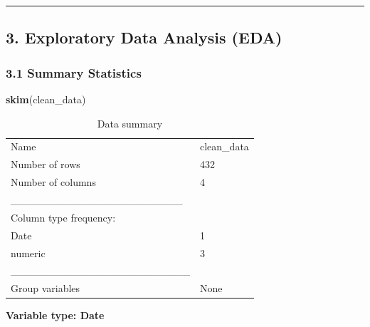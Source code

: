 \documentclass[
]{article}
\newenvironment{Shaded}{\begin{snugshade}}{\end{snugshade}}
\newcommand{\FunctionTok}[1]{\textcolor[rgb]{0.13,0.29,0.53}{\textbf{#1}}}
\newcommand{\NormalTok}[1]{#1}
\begin{document}
\begin{center}\rule{0.5\linewidth}{0.5pt}\end{center}

\subsection{3. Exploratory Data Analysis
(EDA)}\label{exploratory-data-analysis-eda}

\subsubsection{3.1 Summary Statistics}\label{summary-statistics}

\begin{Shaded}
\begin{Highlighting}[]
\FunctionTok{skim}\NormalTok{(clean\_data)}
\end{Highlighting}
\end{Shaded}

\begin{longtable}[]{@{}ll@{}}
\caption{Data summary}\tabularnewline
\toprule\noalign{}
\endfirsthead
\endhead
\bottomrule\noalign{}
\endlastfoot
Name & clean\_data \\
Number of rows & 432 \\
Number of columns & 4 \\
\_\_\_\_\_\_\_\_\_\_\_\_\_\_\_\_\_\_\_\_\_\_\_ & \\
Column type frequency: & \\
Date & 1 \\
numeric & 3 \\
\_\_\_\_\_\_\_\_\_\_\_\_\_\_\_\_\_\_\_\_\_\_\_\_ & \\
Group variables & None \\
\end{longtable}

\textbf{Variable type: Date}
\end{document}
